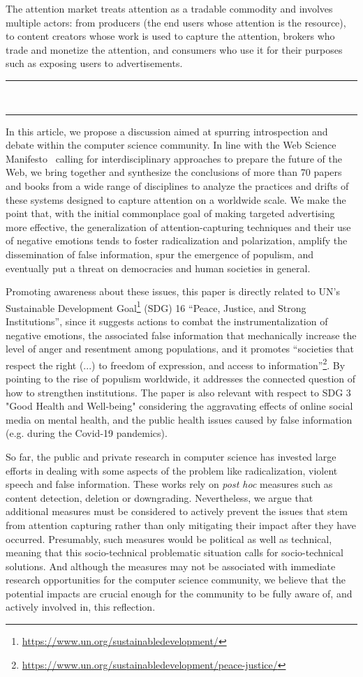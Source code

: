 \documentclass[10pt]{article}
\newcommand*\sepline{%
  \begin{center}
    \rule[1ex]{.17\textwidth}{.5pt}~{\LARGE\ding{104}}~\rule[1ex]{.17\textwidth}{.5pt}
  \end{center}}
\begin{document}
The attention market treats attention as a tradable commodity and involves multiple actors: from producers (the end users whose attention is the resource), to content creators whose work is used to capture the attention, brokers who trade and monetize the attention, and consumers who use it for their purposes such as exposing users to advertisements.


\sepline

In this article, we propose a discussion aimed at spurring introspection and debate within the computer science community. In line with the Web Science Manifesto~\cite{berendt:hal-03189474} calling for interdisciplinary approaches to prepare the future of the Web, we bring together and synthesize the conclusions of more than 70 papers and books from a wide range of disciplines to analyze the practices and drifts of these systems designed to capture attention on a worldwide scale.
We make the point that, with the initial commonplace goal of making targeted advertising more effective, the generalization of attention-capturing techniques and their use of negative emotions tends to foster radicalization and polarization, amplify the dissemination of false information, spur the emergence of populism, and eventually put a threat on democracies and human societies in general.

Promoting awareness about these issues, this paper is directly related to UN's Sustainable Development Goal\footnote{\url{https://www.un.org/sustainabledevelopment/}} (SDG) 16 ``Peace, Justice, and Strong Institutions'', since it suggests actions to combat the instrumentalization of negative emotions, the associated false information that mechanically increase the level of anger and resentment among populations, and it promotes ``societies that respect the right (...) to freedom of expression, and access to information''\footnote{\url{https://www.un.org/sustainabledevelopment/peace-justice/}}.
By pointing to the rise of populism worldwide, it addresses the connected question of how to strengthen institutions.
The paper is also relevant with respect to SDG 3 "Good Health and Well-being" considering the aggravating effects of online social media on mental health, and the public health issues caused by false information (e.g. during the Covid-19 pandemics).

So far, the public and private research in computer science has invested large efforts in dealing with some aspects of the problem like radicalization, violent speech and false information.
These works rely on \textit{post hoc} measures such as content detection, deletion or downgrading.
Nevertheless, we argue that additional measures must be considered to actively prevent the issues that stem from attention capturing rather than only mitigating their impact after they have occurred.
Presumably, such measures would be political as well as technical, meaning that this socio-technical problematic situation calls for socio-technical solutions.
And although the measures may not be associated with immediate research opportunities for the computer science community, we believe that the potential impacts are crucial enough for the community to be fully aware of, and actively involved in, this reflection.
\end{document}
